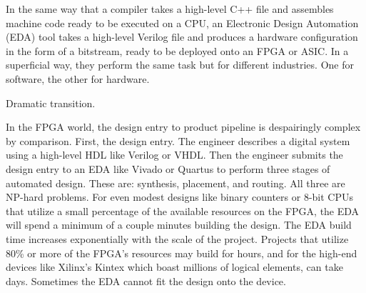 \documentclass{article}
\begin{document}
In the same way that a compiler takes a high-level C++ file and assembles machine code ready to be executed on a CPU, an Electronic Design Automation (EDA) tool takes a high-level Verilog file and produces a hardware configuration in the form of a bitstream, ready to be deployed onto an FPGA or ASIC. In a superficial way, they perform the same task but for different industries. 
One for software, the other for hardware.

Dramatic transition.

In the FPGA world, the design entry to product pipeline is despairingly complex by comparison. 
First, the design entry. The engineer describes a digital system using a high-level HDL like Verilog or VHDL. 
Then the engineer submits the design entry to an EDA like Vivado or Quartus to perform three stages of automated design. 
These are: synthesis, placement, and routing. 
All three are NP-hard problems.
For even modest designs like binary counters or 8-bit CPUs that utilize a small percentage of the available resources on the FPGA, the EDA will spend a minimum of a couple minutes building the design.
The EDA build time increases exponentially with the scale of the project. 
Projects that utilize 80\% or more of the FPGA's resources may build for hours, and for the high-end devices like Xilinx's Kintex which boast millions of logical elements, can take days.
Sometimes the EDA cannot fit the design onto the device.
\end{document}
